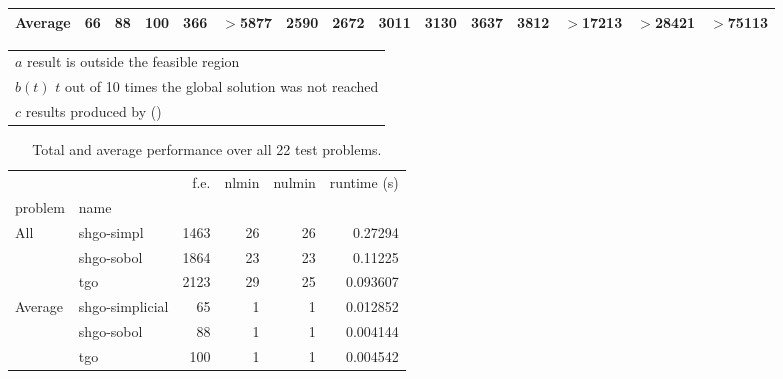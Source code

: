 \begin{landscape}
\begin{table}[htbp]
\begin{tabular}{lrrrrrrrrrrrrrr}
\cmidrule(lr){2-15}
Average  & 66 & 88 & 100 & 366 & $>$5877 & 2590 & 2672 & 3011 & 3130 & 3637 & 3812 & $>$17213 & $>$28421 & $>$75113 \\[0.05cm]
\bottomrule
\end{tabular}
\begin{tabular}{l}
$a$ result is outside the feasible region \\
$b(t)$ $t$ out of 10 times the global solution was not reached \\
$c$ results produced by \citeauthor{Paul2016} (\citeyear{Paul2016})
\end{tabular}
 \label{tab:lc_results}
\end{table}
\thispagestyle{plain}
\end{landscape}


\begin{table}[htbp]
\caption{Total and average performance over all 22 test problems.}
\begin{tabular}{llrrrr}
\toprule
    &                &  f.e. &  nlmin &  nulmin  &   runtime (s) \\
problem & name        &       &        &                  &           \\
\midrule
All & shgo-simpl     &  1463 &     26 &      26  &       0.27294 \\
    & shgo-sobol       &  1864 &     23 &      23 &       0.11225 \\
    & tgo       &  2123 &     29 &      25  &       0.093607 \\
Average & shgo-simplicial      &    65 &      1 &       1  &  0.012852 \\
    & shgo-sobol       &    88 &      1 &       1  &  0.004144 \\
    & tgo      &    100 &      1 &       1  &  0.004542 \\
\bottomrule
\end{tabular}
\label{tb:lc}
\end{table}

